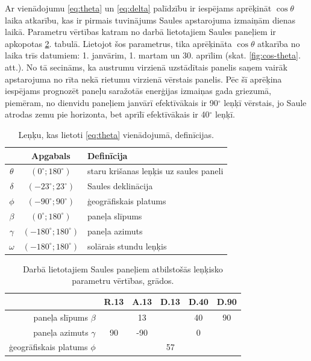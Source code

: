 Ar vienādojumu \ref{eq:theta} un \ref{eq:delta} palīdzību ir iespējams aprēķināt $\cos{\theta}$ laika atkarību, kas ir pirmais tuvinājums Saules apstarojuma izmaiņām dienas laikā.
Parametru vērtības katram no darbā lietotajiem Saules paneļiem ir apkopotas \ref{tab:param}. tabulā.
Lietojot šos parametrus, tika aprēķināta $\cos{\theta}$ atkarība no laika trīs datumiem: 1. janvārim, 1. martam un 30. aprīlim (skat. \ref{fig:cos-theta}. att.). No tā secināms, ka austrumu virzienā uzstādītais panelis saņem vairāk apstarojuma no rīta nekā rietumu virzienā vērstais panelis. Pēc šī aprēķina iespējams prognozēt paneļu saražotās enerģijas izmaiņas gada griezumā, piemēram, no dienvidu paneļiem janvārī efektīvākais ir 90$^\circ$ leņķī vērstais, jo Saule atrodas zemu pie horizonta, bet aprīlī efektīvākais ir 40$^\circ$ leņķī.

\begin{table}[h!]
\caption{Leņķu, kas lietoti \ref{eq:theta} vienādojumā, definīcijas.}
\begin{center}
\begin{tabular}{|c|c|l|}\hline
	         &         Apgabals         & Definīcija\\ \hline
	$\theta$ &  $(0^\circ;180^\circ)$   & staru krišanas leņķis uz saules paneli\\ \hline
	$\delta$ &  $(-23^\circ;23^\circ)$  & Saules deklinācija\\ \hline
	 $\phi$  &  $(-90^\circ;90^\circ)$  & ģeogrāfiskais platums\\ \hline
	$\beta$  &  $(0^\circ;180^\circ)$   & paneļa slīpums \\ \hline
	$\gamma$ & $(-180^\circ;180^\circ)$ & paneļa azimuts \\ \hline
	$\omega$ & $(-180^\circ;180^\circ)$ & solārais stundu leņķis\\ \hline
\end{tabular}
\end{center}
\label{tab:theta}
\end{table}

\begin{table}[h!]
	\caption{Darbā lietotajiem Saules paneļiem atbilstošās leņķisko parametru vērtības, grādos.}
	\begin{center}
		\begin{tabular}{|r|c|c|c|c|c|}
			\hline
			         & R.13 & A.13 &   D.13   & D.40 & D.90 \\ \hline
			paneļa slīpums $\beta$  & \multicolumn{3}{c|}{13} &  40  &  90  \\ \hline
			paneļa azimuts $\gamma$ &  90  & -90  & \multicolumn{3}{c|}{0}  \\ \hline
			ģeogrāfiskais platums $\phi$  &        \multicolumn{5}{c|}{57}        \\ \hline
		\end{tabular}
	\end{center}
	\label{tab:param}
\end{table}

